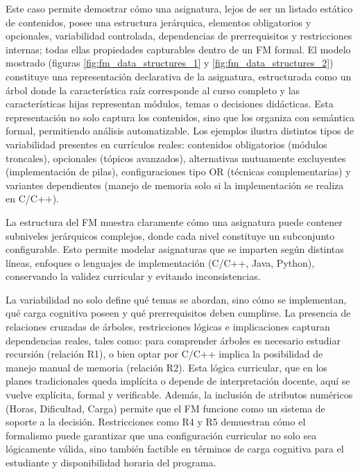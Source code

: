 Este caso permite demostrar cómo una asignatura, lejos de ser un 
listado estático de contenidos, posee una estructura jerárquica, 
elementos obligatorios y opcionales, variabilidad controlada, 
dependencias de prerrequisitos y restricciones internas; todas 
ellas propiedades capturables dentro de un \ac{FM} formal.
El modelo mostrado (figuras \ref{fig:fm_data_structures_1} y \ref{fig:fm_data_structures_2}) 
constituye una representación declarativa de la asignatura, 
estructurada como un árbol donde la característica raíz corresponde al curso 
completo y las características hijas representan módulos, temas o decisiones 
didácticas. Esta representación no solo captura los contenidos, sino que los 
organiza con semántica formal, permitiendo análisis automatizable. Los ejemplos 
ilustra distintos tipos de variabilidad presentes en currículos reales:
contenidos obligatorios (módulos troncales), opcionales (tópicos avanzados), 
alternativas mutuamente excluyentes (implementación de pilas), configuraciones 
tipo OR (técnicas complementarias) y variantes dependientes 
(manejo de memoria solo si la implementación se realiza en C/C++).

La estructura del \ac{FM} muestra claramente cómo una asignatura puede contener 
subniveles jerárquicos complejos, donde cada nivel constituye un subconjunto 
configurable. Esto permite modelar asignaturas que se imparten según distintas 
líneas, enfoques o lenguajes de implementación (C/C++, Java, Python), conservando 
la validez curricular y evitando inconsistencias.

La variabilidad no solo define qué temas se abordan, sino cómo se implementan, 
qué carga cognitiva poseen y qué prerrequisitos deben cumplirse. La presencia de 
relaciones cruzadas de árboles, restricciones lógicas e implicaciones capturan dependencias 
reales, tales como: para comprender árboles es necesario estudiar recursión 
(relación R1), o 
bien optar por C/C++ implica la posibilidad de manejo manual de memoria
(relación R2). 
Esta lógica curricular, que en los planes tradicionales queda implícita o 
depende de interpretación docente, aquí se vuelve explícita, formal y verificable.
Además, la inclusión de atributos numéricos (Horas, Dificultad, Carga) permite que el 
\ac{FM} funcione como un sistema de soporte a la decisión. Restricciones como     
R4 y R5 demuestran cómo el formalismo puede 
garantizar que una configuración curricular no solo sea lógicamente 
válida, sino también factible en términos de carga cognitiva para el 
estudiante y disponibilidad horaria del programa.

